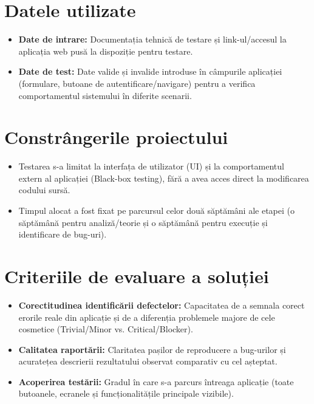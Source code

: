 \section{Datele utilizate}
\begin{itemize}
    \item \textbf{Date de intrare:} Documentația tehnică de testare și link-ul/accesul la aplicația web pusă la dispoziție pentru testare.
    \item \textbf{Date de test:} Date valide și invalide introduse în câmpurile aplicației (formulare, butoane de autentificare/navigare) pentru a verifica comportamentul sistemului în diferite scenarii.
\end{itemize}

\section{Constrângerile proiectului}
\begin{itemize}
    \item Testarea s-a limitat la interfața de utilizator (UI) și la comportamentul extern al aplicației (Black-box testing), fără a avea acces direct la modificarea codului sursă.
    \item Timpul alocat a fost fixat pe parcursul celor două săptămâni ale etapei (o săptămână pentru analiză/teorie și o săptămână pentru execuție și identificare de bug-uri).
\end{itemize}

\section{Criteriile de evaluare a soluției}
\begin{itemize}
    \item \textbf{Corectitudinea identificării defectelor:} Capacitatea de a semnala corect erorile reale din aplicație și de a diferenția problemele majore de cele cosmetice (Trivial/Minor vs. Critical/Blocker).
    \item \textbf{Calitatea raportării:} Claritatea pașilor de reproducere a bug-urilor și acuratețea descrierii rezultatului observat comparativ cu cel așteptat.
    \item \textbf{Acoperirea testării:} Gradul în care s-a parcurs întreaga aplicație (toate butoanele, ecranele și funcționalitățile principale vizibile).
\end{itemize}